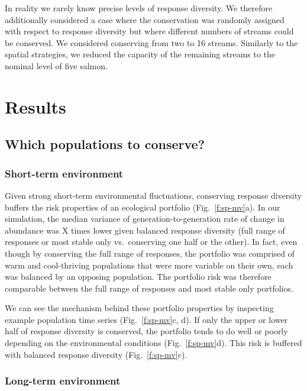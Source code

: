 In reality we rarely know precise levels of response diversity. We therefore additionally considered a case where the conservation was randomly assigned with respect to response diversity but where different numbers of streams could be conserved. We considered conserving from two to 16 streams. Similarly to the spatial strategies, we reduced the capacity of the remaining streams to the nominal level of five salmon.

\section{Results}

\subsection{Which populations to conserve?}

\subsubsection{Short-term environment}

Given strong short-term environmental fluctuations, conserving response diversity buffers the risk properties of an ecological portfolio (Fig.~\ref{f:sp-mv}a). In our simulation, the median variance of generation-to-generation rate of change in abundance was X times lower given balanced response diversity (full range of responses or most stable only vs.~conserving one half or the other). In fact, even though by conserving the full range of responses, the portfolio was comprised of warm and cool-thriving populations that were more variable on their own, each was balanced by an opposing population. The portfolio risk was therefore comparable between the full range of responses and most stable only portfolios.

We can see the mechanism behind these portfolio properties by inspecting example population time series (Fig.~\ref{f:sp-mv}c, d). If only the upper or lower half of response diversity is conserved, the portfolio tends to do well or poorly depending on the environmental conditions (Fig.~\ref{f:sp-mv}d). This risk is buffered with balanced response diversity (Fig.~\ref{f:sp-mv}c).

\subsubsection{Long-term environment}

